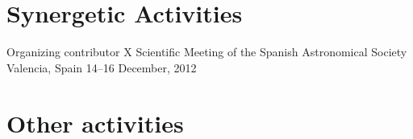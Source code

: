 \section{Synergetic Activities}

\cventry{}%
{Organizing contributor}%
{X Scientific Meeting of the Spanish Astronomical Society}%
{Valencia, Spain}%
{14--16 December, 2012}%
{}
%

\section{Other activities}

